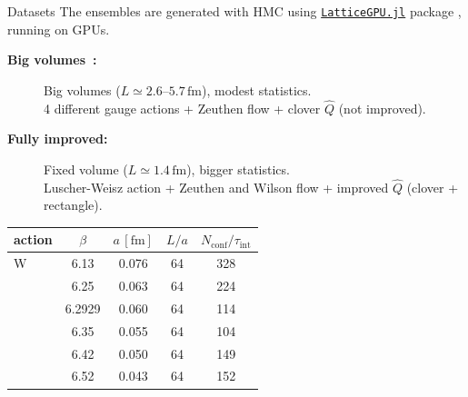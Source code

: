 \begin{block}{Datasets}
    The ensembles are generated with HMC using \href{https://igit.ific.uv.es/alramos/latticegpu.jl}{\verb|LatticeGPU.jl|}   
    package \cite{Catumba:2025jae}, running on GPUs.
    \begin{description}
        \item[\textbf{Big volumes~\cite{RamosMartinez:2023tvx}:}]
        {\color{coolgreen}
            Big volumes ($L\simeq 2.6\text{--}5.7\,\mathrm{fm}$), modest statistics. \\
            4 different gauge actions + Zeuthen flow + clover $\hat Q$ (not improved).
        } 
        \item[\textbf{Fully improved:}] 
        {\color{coolblue}
            Fixed volume ($L\simeq 1.4\,\mathrm{fm}$), bigger statistics. \\ 
            Luscher-Weisz action + Zeuthen and Wilson flow + improved $\hat Q$ 
            (clover + rectangle).
        }
    \end{description}
    \medskip
    \centering
    \begin{minipage}[t]{0.48\textwidth}
        \centering
        \setlength{\tabcolsep}{0.55em}
        \renewcommand{\arraystretch}{1.05}
        \begin{tabular}{lcccc}
        \toprule
            action & $\beta$ & $a\,[\mathrm{fm}]$ & $L/a$ & $N_\mathrm{conf}/\tau_\mathrm{int}$\\
        \midrule
            W   & {\color{coolgreen} 6.13  } & {\color{coolgreen} 0.076 }  & {\color{coolgreen} 64    } & {\color{coolgreen} 328   }  \\
                & {\color{coolgreen} 6.25  } & {\color{coolgreen} 0.063 }  & {\color{coolgreen} 64    } & {\color{asparagus} 224   }  \\
                & {\color{coolgreen} 6.2929} & {\color{coolgreen} 0.060 }  & {\color{coolgreen} 64    } & {\color{coolgreen} 114   }  \\
                & {\color{coolgreen} 6.35  } & {\color{coolgreen} 0.055 }  & {\color{coolgreen} 64    } & {\color{coolgreen} 104   }  \\
                & {\color{coolgreen} 6.42  } & {\color{coolgreen} 0.050 }  & {\color{coolgreen} 64    } & {\color{coolgreen} 149   }  \\
                & {\color{coolgreen} 6.52  } & {\color{coolgreen} 0.043 }  & {\color{coolgreen} 64    } & {\color{coolgreen} 152   }  \\

\end{tabular}
\end{minipage}
\end{block}
